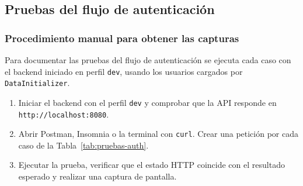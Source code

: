 \documentclass[12pt,a4paper,twoside]{report}
\begin{document}
\subsection{Pruebas del flujo de autenticación}

\subsubsection{Procedimiento manual para obtener las capturas}

Para documentar las pruebas del flujo de autenticaci\'on se ejecuta cada caso con el backend iniciado en perfil \texttt{dev}, usando los usuarios cargados por \texttt{DataInitializer}.
\begin{enumerate}
  \item Iniciar el backend con el perfil \texttt{dev} y comprobar que la API responde en \texttt{http://localhost:8080}.
  \item Abrir Postman, Insomnia o la terminal con \texttt{curl}. Crear una petici\'on por cada caso de la Tabla~\ref{tab:pruebas-auth}.
  \item Ejecutar la prueba, verificar que el estado HTTP coincide con el resultado esperado y realizar una captura de pantalla.
\end{enumerate}
\end{document}
